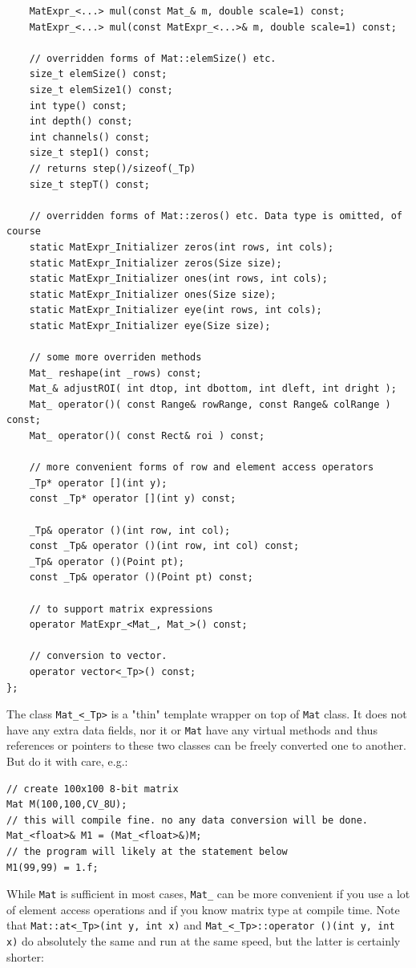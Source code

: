 \begin{lstlisting}
    MatExpr_<...> mul(const Mat_& m, double scale=1) const;
    MatExpr_<...> mul(const MatExpr_<...>& m, double scale=1) const;

    // overridden forms of Mat::elemSize() etc.
    size_t elemSize() const;
    size_t elemSize1() const;
    int type() const;
    int depth() const;
    int channels() const;
    size_t step1() const;
    // returns step()/sizeof(_Tp)
    size_t stepT() const;

    // overridden forms of Mat::zeros() etc. Data type is omitted, of course
    static MatExpr_Initializer zeros(int rows, int cols);
    static MatExpr_Initializer zeros(Size size);
    static MatExpr_Initializer ones(int rows, int cols);
    static MatExpr_Initializer ones(Size size);
    static MatExpr_Initializer eye(int rows, int cols);
    static MatExpr_Initializer eye(Size size);

    // some more overriden methods
    Mat_ reshape(int _rows) const;
    Mat_& adjustROI( int dtop, int dbottom, int dleft, int dright );
    Mat_ operator()( const Range& rowRange, const Range& colRange ) const;
    Mat_ operator()( const Rect& roi ) const;

    // more convenient forms of row and element access operators 
    _Tp* operator [](int y);
    const _Tp* operator [](int y) const;

    _Tp& operator ()(int row, int col);
    const _Tp& operator ()(int row, int col) const;
    _Tp& operator ()(Point pt);
    const _Tp& operator ()(Point pt) const;

    // to support matrix expressions
    operator MatExpr_<Mat_, Mat_>() const;
    
    // conversion to vector.
    operator vector<_Tp>() const;
};
\end{lstlisting}

The class \texttt{Mat\_<\_Tp>} is a "thin" template wrapper on top of \texttt{Mat} class. It does not have any extra data fields, nor it or \texttt{Mat} have any virtual methods and thus references or pointers to these two classes can be freely converted one to another. But do it with care, e.g.:

\begin{lstlisting}
// create 100x100 8-bit matrix
Mat M(100,100,CV_8U);
// this will compile fine. no any data conversion will be done.
Mat_<float>& M1 = (Mat_<float>&)M;
// the program will likely at the statement below
M1(99,99) = 1.f;
\end{lstlisting}

While \texttt{Mat} is sufficient in most cases, \texttt{Mat\_} can be more convenient if you use a lot of element access operations and if you know matrix type at compile time. Note that \texttt{Mat::at<\_Tp>(int y, int x)} and \texttt{Mat\_<\_Tp>::operator ()(int y, int x)} do absolutely the same and run at the same speed, but the latter is certainly shorter:

